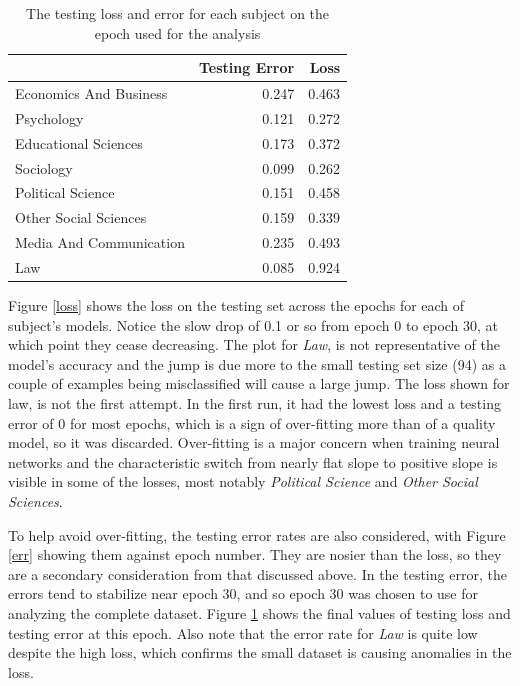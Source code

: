\documentclass[12pt, a4paper]{article}
\begin{document}
\begin{table}[ht]
	\centering
	\begin{adjustbox}{center}
		\begin{tabular}{lrr}
			\toprule
			{} &  Testing Error &   Loss \\
			\midrule
			Economics And Business  &         \num{0.247} & \num{0.463} \\
			Psychology              &         \num{0.121} & \num{0.272} \\
			Educational Sciences    &         \num{0.173} & \num{0.372} \\
			Sociology               &         \num{0.099} & \num{0.262} \\
			Political Science       &         \num{0.151} & \num{0.458} \\
			Other Social Sciences   &         \num{0.159} & \num{0.339} \\
			Media And Communication &         \num{0.235} & \num{0.493} \\
			Law                     &         \num{0.085} & \num{0.924} \\
			\bottomrule
		\end{tabular}
	\end{adjustbox}
	\caption{The testing loss and error for each subject on the epoch used for the analysis}\label{final_loss}
\end{table}

Figure \ref{loss} shows the loss on the testing set across the epochs for each of subject's models. Notice the slow drop of \num{0.1} or so from epoch 0 to epoch 30, at which point they cease decreasing. The plot for \textit{Law}, is not representative of the model's accuracy and the jump is due more to the small testing set size (94) as a couple of examples being misclassified will cause a large jump. The loss shown for law, is not the first attempt. In the first run, it had the lowest loss and a testing error of 0 for most epochs, which is a sign of over-fitting more than of a quality model, so it was discarded. Over-fitting is a major concern when training neural networks \citep{james2013introduction} and the characteristic switch from nearly flat slope to positive slope is visible in some of the losses, most notably \textit{Political Science} and \textit{Other Social Sciences}.

To help avoid over-fitting, the testing error rates are also considered, with Figure \ref{err} showing them against epoch number. They are nosier than the loss, so they are a secondary consideration from that discussed above. In the testing error, the errors tend to stabilize near epoch 30, and so epoch 30 was chosen to use for analyzing the complete dataset. Figure \ref{final_loss} shows the final values of testing loss and testing error at this epoch. Also note that the error rate for \textit{Law} is quite low despite the high loss, which confirms the small dataset is causing anomalies in the loss.
\end{document}

